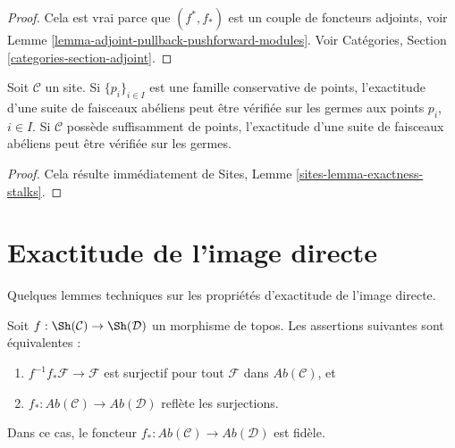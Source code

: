 \begin{proof}
Cela est vrai parce que $(f^*, f_*)$ est un couple de foncteurs adjoints, voir
Lemme \ref{lemma-adjoint-pullback-pushforward-modules}. Voir Catégories,
Section \ref{categories-section-adjoint}.
\end{proof}

\begin{lemma}
\label{lemma-check-exactness-stalks}
Soit $\mathcal{C}$ un site. Si $\{p_i\}_{i \in I}$ est une famille conservative
de points, l'exactitude d'une suite de faisceaux abéliens peut être vérifiée sur
les germes aux points $p_i$, $i \in I$. Si $\mathcal{C}$ possède suffisamment
de points, l'exactitude d'une suite de faisceaux abéliens peut être vérifiée sur
les germes.
\end{lemma}

\begin{proof}
Cela résulte immédiatement de Sites, Lemme
\ref{sites-lemma-exactness-stalks}.
\end{proof}





\section{Exactitude de l'image directe}
\label{section-pushforward}

\noindent
Quelques lemmes techniques sur les propriétés d'exactitude de l'image directe.

\begin{lemma}
\label{lemma-reflect-surjections}
Soit $f : \Sh(\mathcal{C}) \to \Sh(\mathcal{D})$ un morphisme de topos. Les
assertions suivantes sont équivalentes :
\begin{enumerate}
\item $f^{-1}f_*\mathcal{F} \to \mathcal{F}$ est surjectif pour tout
$\mathcal{F}$ dans $\textit{Ab}(\mathcal{C})$, et
\item $f_* : \textit{Ab}(\mathcal{C}) \to \textit{Ab}(\mathcal{D})$
reflète les surjections.
\end{enumerate}
Dans ce cas, le foncteur
$f_* : \textit{Ab}(\mathcal{C}) \to \textit{Ab}(\mathcal{D})$
est fidèle.
\end{lemma}

